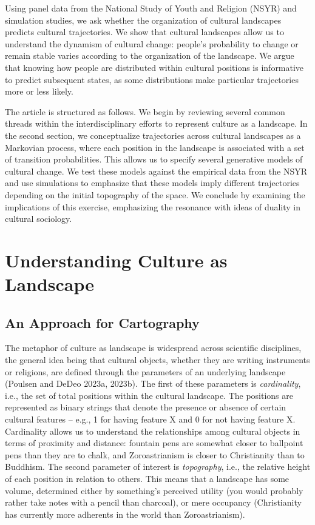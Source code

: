 \documentclass[
  11pt,
]{article}
\begin{document}
Using panel data from the National Study of Youth and Religion (NSYR)
and simulation studies, we ask whether the organization of cultural
landscapes predicts cultural trajectories. We show that cultural
landscapes allow us to understand the dynamism of cultural change:
people's probability to change or remain stable varies according to the
organization of the landscape. We argue that knowing how people are
distributed within cultural positions is informative to predict
subsequent states, as some distributions make particular trajectories
more or less likely.

The article is structured as follows. We begin by reviewing several
common threads within the interdisciplinary efforts to represent culture
as a landscape. In the second section, we conceptualize trajectories
across cultural landscapes as a Markovian process, where each position
in the landscape is associated with a set of transition probabilities.
This allows us to specify several generative models of cultural change.
We test these models against the empirical data from the NSYR and use
simulations to emphasize that these models imply different trajectories
depending on the initial topography of the space. We conclude by
examining the implications of this exercise, emphasizing the resonance
with ideas of duality in cultural sociology.

\hypertarget{understanding-culture-as-landscape}{%
\section{Understanding Culture as
Landscape}\label{understanding-culture-as-landscape}}

\hypertarget{an-approach-for-cartography}{%
\subsection{An Approach for
Cartography}\label{an-approach-for-cartography}}

The metaphor of culture as landscape is widespread across scientific
disciplines, the general idea being that cultural objects, whether they
are writing instruments or religions, are defined through the parameters
of an underlying landscape (Poulsen and DeDeo 2023a, 2023b). The first
of these parameters is \emph{cardinality}, i.e., the set of total
positions within the cultural landscape. The positions are represented
as binary strings that denote the presence or absence of certain
cultural features -- e.g., 1 for having feature X and 0 for not having
feature X. Cardinality allows us to understand the relationships among
cultural objects in terms of proximity and distance: fountain pens are
somewhat closer to ballpoint pens than they are to chalk, and
Zoroastrianism is closer to Christianity than to Buddhism. The second
parameter of interest is \emph{topography}, i.e., the relative height of
each position in relation to others. This means that a landscape has
some volume, determined either by something's perceived utility (you
would probably rather take notes with a pencil than charcoal), or mere
occupancy (Christianity has currently more adherents in the world than
Zoroastrianism).
\end{document}
